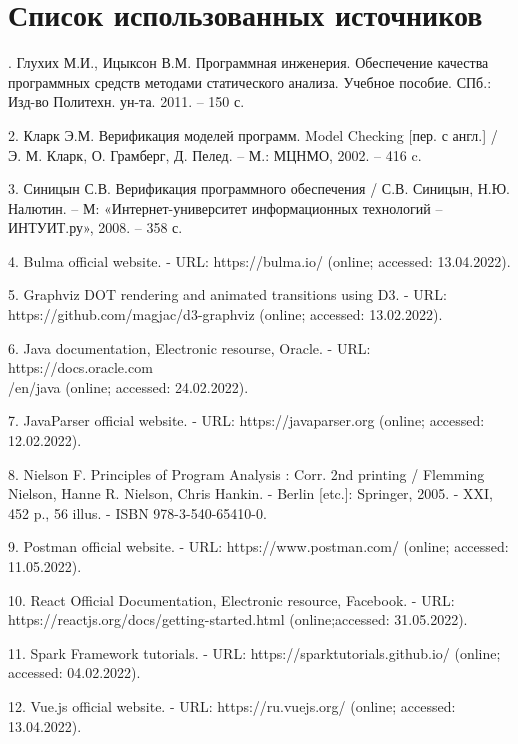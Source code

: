 \clearpage                                  %
\chapter*{Список использованных источников}
\label{references}
. Глухих М.И., Ицыксон В.М. Программная инженерия. Обеспечение качества программных средств методами статического анализа. Учебное пособие. СПб.: Изд-во Политехн. ун-та. 2011. – 150 с.

2. Кларк Э.М. Верификация моделей программ. Model Checking [пер. с англ.] / Э. М. Кларк, О. Грамберг, Д. Пелед. – М.: МЦНМО, 2002. – 416 c.

3. Синицын С.В. Верификация программного обеспечения / С.В. Синицын, Н.Ю. Налютин. – М: «Интернет-университет информационных технологий – ИНТУИТ.ру», 2008. – 358 с.

4. Bulma official website. - URL: https://bulma.io/ (online; accessed: 13.04.2022).

5. Graphviz DOT rendering and animated transitions using D3. - URL: https://github.com/magjac/d3-graphviz (online; accessed: 13.02.2022).

6. Java documentation, Electronic resourse, Oracle. - URL: https://docs.oracle.com\\/en/java (online; accessed: 24.02.2022).

7. JavaParser official website. - URL: https://javaparser.org (online; accessed: 12.02.2022).

8. Nielson F. Principles of Program Analysis : Corr. 2nd printing / Flemming Nielson, Hanne R. Nielson, Chris Hankin. - Berlin [etc.]: Springer, 2005. - XXI, 452 p., 56 illus. - ISBN 978-3-540-65410-0.

9. Postman official website. - URL: https://www.postman.com/ (online; accessed: 11.05.2022).

10. React Official Documentation, Electronic resource, Facebook. - URL: https://reactjs.org/docs/getting-started.html (online;accessed: 31.05.2022).

11. Spark Framework tutorials. - URL: https://sparktutorials.github.io/ (online; accessed: 04.02.2022).

12. Vue.js official website. - URL: https://ru.vuejs.org/ (online; accessed: 13.04.2022).
